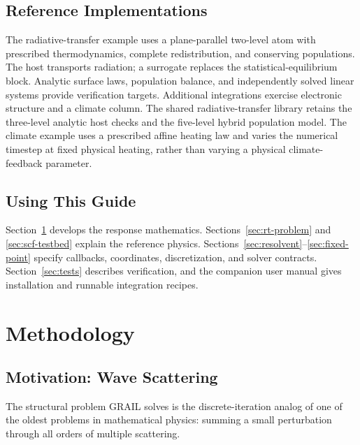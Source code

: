 \documentclass[11pt]{article}
\begin{document}
\subsection{Reference Implementations}
\label{sec:1d-testbed}
The radiative-transfer example uses a plane-parallel two-level atom with
prescribed thermodynamics, complete redistribution, and conserving
populations. The host transports radiation; a surrogate replaces the
statistical-equilibrium block. Analytic surface laws, population balance,
and independently solved linear systems provide verification targets.
Additional integrations exercise electronic structure and a climate column.
The shared radiative-transfer library retains the three-level analytic
host checks and the five-level hybrid population model.
The climate example uses a prescribed affine heating law and varies
the numerical timestep at fixed physical heating, rather than varying
a physical climate-feedback parameter.

\subsection{Using This Guide}
\label{sec:document-roadmap}
Section~\ref{sec:methodology} develops the response mathematics.
Sections~\ref{sec:rt-problem} and \ref{sec:scf-testbed} explain the
reference physics. Sections~\ref{sec:resolvent}--\ref{sec:fixed-point}
specify callbacks, coordinates, discretization, and solver contracts.
Section~\ref{sec:tests} describes verification, and the companion
user manual gives installation and runnable integration recipes.

\section{Methodology}
\label{sec:methodology}

\subsection{Motivation: Wave Scattering}
\label{sec:lippmann-schwinger}

The structural problem GRAIL solves is the discrete-iteration analog
of one of the oldest problems in mathematical physics: summing a small
perturbation through all orders of multiple scattering.
\end{document}
